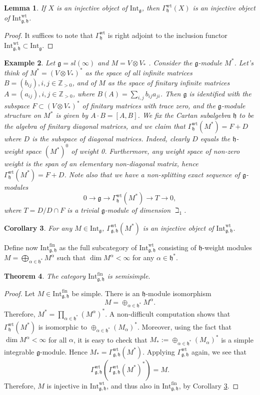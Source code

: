 \documentclass{birkmult}
\newcounter{theorem}
\newtheorem{theo}{Theorem}[section]
\newtheorem{example}[theo]{Example}
\newtheorem{lemma}[theo]{Lemma}
\newtheorem{corollary}[theo]{Corollary}
\newcommand{\hh}{\mathfrak{h}}
\renewcommand{\gg}{\mathfrak{g}}
\newcommand{\Int}{\mathrm{Int}}
\newcommand{\Intwt}{\Int^{\mathrm{wt}}_{\gg,\hh}}
\newcommand{\Intfin}{\Int^{\mathrm{fin}}_{\gg,\hh}}
\begin{document}
\begin{lemma}\label{wtinj} If $X$ is an injective object of
  $\Int_\gg$, then $\Gamma^{\mathrm{wt}}_\hh(X)$ is an injective object of $\Intwt$.
\end{lemma}
\begin{proof} 
It suffices to note that $\Gamma_\hh^{\mathrm{wt}}$ is right adjoint
to the inclusion functor $\Int_{\gg,\hh}^{\mathrm{wt}}\subset\Int_\gg$.
\end{proof}
\begin{example}\label{ex36}{\rm  Let $\gg=sl(\infty)$
and $M=V\otimes V_*$ . Consider the $\gg$-module
$M^*$. Let's think of $M^*=(V\otimes V_*)^*$ as the space of all
infinite matrices $B=(b_{ij}), i,j\in \mathbb Z_{>0}$, and of $M$
as the space of finitary infinite matrices $A=(a_{ij}), i,j\in
\mathbb Z_{>0}$, where $B(A)=\sum_{i,j} b_{ij}a_{ji}$. Then $\gg$
is identified with the subspace $F\subset (V\otimes V_*)^*$ of
finitary matrices with trace zero, and the $\gg$-module structure
on $M^*$ is given by $A\cdot B=[A,B]$. We fix the Cartan
subalgebra $\hh$ to be the algebra of finitary diagonal matrices, and
we claim that $\Gamma^{\mathrm{wt}}_\hh(M^*)=F+D$ where $D$ is
the subspace of diagonal matrices. Indeed, clearly $D$ equals the
$\hh$-weight space $(M^*)^0$ of weight 0. Furthermore, any
weight space of non-zero weight is the span of an elementary
non-diagonal matrix, hence $\Gamma^{\mathrm{wt}}_\hh(M^*)=F+D$.
Note also that we have a non-splitting exact sequence of
$\gg$-modules
$$0\to\gg\to\Gamma^{\mathrm{wt}}_\hh(M^*)\to T\to 0,$$ where $T=D/D\cap
F$ is a trivial $\gg$-module of dimension $\beth_1$. }
\end{example}

\begin{corollary}\label{wtinj1} For any $M\in\Int_\gg$, $\Gamma^{\mathrm{wt}}_{\gg,\hh}(M^*)$
is an injective object of $\Intwt$.
\end{corollary}

Define now $\Intfin$ as the full subcategory of $\Intwt$ consisting of
$\hh$-weight modules $M=\bigoplus_{\alpha\in\hh^*}M^\alpha$ such that
$\dim M^\alpha<\infty$ for any $\alpha\in\hh^*$.

\begin{theo}\label{simpfin} The category $\Intfin$ is semisimple.
\end{theo}
\begin{proof}
Let $M\in\Intfin$ be simple. There is an $\hh$-module isomorphism
$$\displaystyle M=\oplus_{\alpha\in\hh^*}M^{\alpha}.$$
Therefore, $M^*=\prod_{\alpha\in\hh^*} (M^{\alpha})^*$. A
non-difficult computation shows that
$\Gamma^{\mathrm{wt}}_\hh(M^*)$ is isomorphic to
$\oplus_{\alpha\in\hh^*}(M_{\alpha})^*$. Moreover, using the fact that $\dim M^\alpha<\infty$ for all $\alpha$, it is easy to
check that $\displaystyle
M_*:=\oplus_{\alpha\in\hh^*}(M_{\alpha})^*$ is a simple integrable
$\gg$-module. Hence $M_*=\Gamma^{\mathrm{wt}}_{\gg,\hh}(M^*)$.
Applying $\Gamma^{\mathrm{wt}}_{\gg,\hh}$ again, we see that
$$\Gamma^{\mathrm{wt}}_{\gg,\hh}(\Gamma^{\mathrm{wt}}_{\gg,\hh}(M^*)^*)= M.$$
Therefore, $M$ is injective in $\Intwt$, and thus also in $\Intfin$, by Corollary \ref{wtinj1}.
\end{proof}
\end{document}
